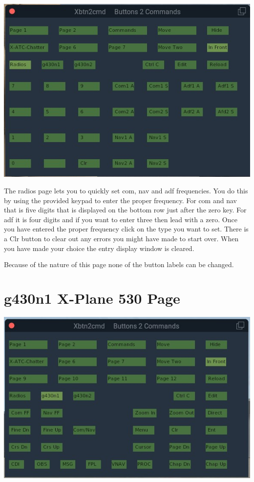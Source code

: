 \documentclass[11pt,parskip=half,a4paper]{scrartcl}
\begin{document}
\begin{center}
\includegraphics[width=15cm]{../pics/Xbtn2cmd_Radios_Page.jpg}
\end{center}

The radios page lets you to quickly set com, nav and adf frequencies. You do this by using the provided keypad to enter the proper frequency. For com and nav that is five digits that is displayed on the bottom row just after the zero key. For adf it is four digits and if you want to enter three then lead with a zero. Once you have entered the proper frequency click on the type you want to set. There is a Clr button to clear out any errors you might have made to start over. When you have made your choice the entry display window is cleared. \newline

Because of the nature of this page none of the button labels can be changed.

\newpage
\section{g430n1 X-Plane 530 Page}

\begin{center}
\includegraphics[width=15cm]{../pics/Xbtn2cmd_g430n1_530_Page.jpg}
\end{center}
\end{document}
